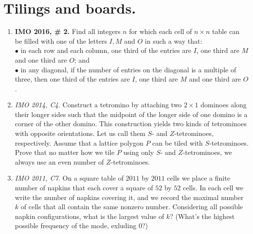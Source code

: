 \documentclass[11pt,a4paper]{article}
\begin{document}
\section{Tilings and boards.}
\begin{enumerate}
\item\textbf {IMO 2016, \# 2.} Find all integers $n$ for which each cell of $n \times n$ table can be filled with one of the letters $I,M$ and $O$ in such a way that:\\
$\bullet$  in each row and each column, one third of the entries are $I$, one third are $M$ and one third are $O$; and\\
$\bullet$ in any diagonal, if the number of entries on the diagonal is a multiple of three, then one third of the entries are $I$, one third are $M$ and one third are $O$.

\item\emph {IMO 2014, C4.} Construct a tetromino by attaching two $2 \times 1$ dominoes along their longer sides such that the midpoint of the longer side of one domino is a corner of the other domino. This construction yields two kinds of tetrominoes with opposite orientations. Let us call them $S$- and $Z$-tetrominoes, respectively.
Assume that a lattice polygon $P$ can be tiled with $S$-tetrominoes. Prove that no matter how we tile $P$ using only $S$- and $Z$-tetrominoes, we always use an even number of $Z$-tetrominoes.

\item\emph{IMO 2011, C7.} On a square table of $2011$ by $2011$ cells we place a finite number of napkins that each cover a square of $52$ by $52$ cells. In each cell we write the number of napkins covering it, and we record the maximal number $k$ of cells that all contain the same nonzero number. Considering all possible napkin configurations, what is the largest value of $k$? (What's the highest possible frequency of the mode, exluding 0?)
\end{enumerate}
\end{document}

